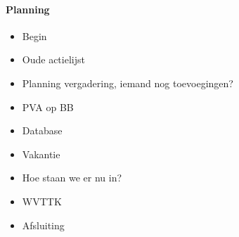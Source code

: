 \documentclass[11pt]{article}
\begin{document}
\paragraph{Planning}
\begin{itemize}
	\item Begin
	\item Oude actielijst
	\item Planning vergadering, iemand nog toevoegingen?
	\item PVA op BB
	\item Database
	\item Vakantie
	\item Hoe staan we er nu in?
	\item WVTTK
    \item Afsluiting

\end{itemize}
\end{document}

